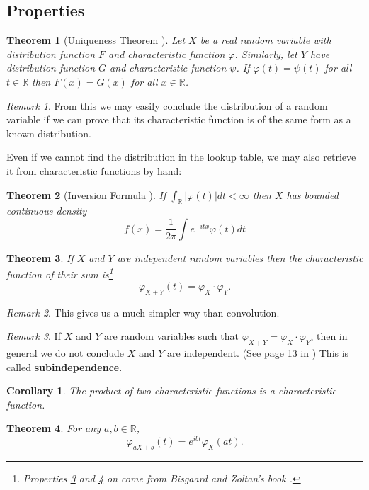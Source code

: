 \documentclass{article}
\theoremstyle{definition}
\theoremstyle{plain}
\newtheorem{theorem}{Theorem}[section]
\newtheorem{corollary}{Corollary}[theorem]
\theoremstyle{remark}
\newtheorem*{remark}{Remark}
\newcommand{\reals}{\mathbb{R}}
\begin{document}
\subsection{Properties}
\begin{theorem}[Uniqueness Theorem \cite{uChicago}]
	Let $X$ be a real random variable with distribution function
	$F$ and characteristic function $\varphi$. Similarly, let $Y$ have distribution
	function $G$ and characteristic function $\psi$. If $\varphi(t) = \psi(t)$ for all $t\in\reals$
	then $F(x) = G(x)$ for all $x \in\reals$.
\end{theorem}
\begin{remark}
	From this we may easily conclude the distribution of a random variable if we can prove that its characteristic function is of the same form as a known distribution.
\end{remark}
Even if we cannot find the distribution in the lookup table, we may also retrieve it from characteristic functions by hand:
\begin{theorem}[Inversion Formula \cite{pte}]
If $\int_\reals |\varphi(t)| dt < \infty$ then $X$ has bounded continuous density
$$
f(x) = \frac1{2\pi} \int e^{-itx}\varphi(t)dt
$$
\end{theorem}
\begin{theorem}
	If $X$ and $Y$ are independent random variables then the characteristic function of their sum is\footnote{Properties \ref{thm:indept} and \ref{thm:linear} on come from Bisgaard and Zoltan's book \cite{cfms}.} 
	$$\varphi_{X+Y}(t) = \varphi_{X}\cdot\varphi_{Y}.$$
	\label{thm:indept}
\end{theorem}
\begin{remark}
This gives us a much simpler way than convolution.
\end{remark} 
\begin{remark}
If $X$ and $Y$ are random variables such that $\varphi_{X+Y} = \varphi_X\cdot\varphi_Y $, then in general we do not conclude $X$ and $Y$ are independent. (See page 13 in \cite{cfms}) This is called \textbf{subindependence}\cite{wiki:subindependence}.
\end{remark} 
\begin{corollary}
	The product of two characteristic functions is a characteristic function.
\end{corollary}
\begin{theorem}
	For any $a,b \in \reals$, $$\varphi_{aX+b}(t)=e^{ibt}\varphi_X(at).$$
	\label{thm:linear}
\end{theorem}
\end{document}
